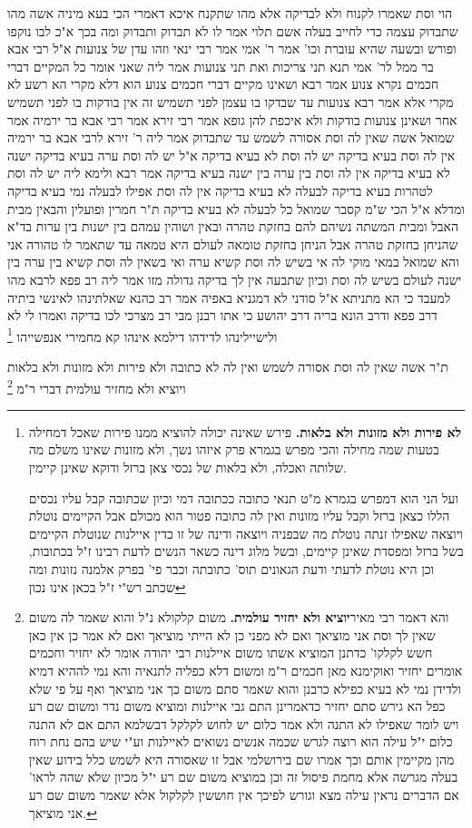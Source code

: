 \documentclass[12pt, openany]{book}
\newcommand{\footnotecomment}[1]{\footnote{#1}}
\newcommand{\commenta}[1]{\footnotecomment{#1}}
\begin{document}
{הוי  וסת שאמרו לקנוח ולא לבדיקה  אלא  מהו שתקנח 
איכא דאמרי הכי בעא מיניה  אשה מהו שתבדוק עצמה כדי לחייב בעלה אשם תלוי  אמר לו  לא תבדוק  ותבדוק ומה בכך  א"כ לבו נוקפו ופורש
ובשעה שהיא עוברת וכו' אמר ר' אמי אמר רבי ינאי  וזהו עדן של צנועות  א"ל רבי אבא בר ממל לר' אמי  תנא תני צריכות ואת תני צנועות  אמר ליה  שאני אומר כל המקיים דברי חכמים נקרא צנוע 
אמר רבא  ושאינו מקיים דברי חכמים צנוע הוא דלא מקרי הא רשע לא מקרי  אלא אמר רבא צנועות עד שבדקו בו עצמן לפני תשמיש זה אין בודקות בו לפני תשמיש אחר  ושאינן צנועות בודקות ולא איכפת להן 
גופא אמר רבי זירא אמר רבי אבא בר ירמיה אמר שמואל  אשה שאין לה וסת אסורה לשמש עד שתבדוק  אמר ליה ר' זירא לרבי אבא בר ירמיה  אין לה וסת בעיא בדיקה יש לה וסת לא בעיא בדיקה 
א"ל  יש לה וסת ערה בעיא בדיקה ישנה לא בעיא בדיקה אין לה וסת בין ערה בין ישנה בעיא בדיקה 
אמר רבא ולימא ליה  יש לה וסת לטהרות בעיא בדיקה לבעלה לא בעיא בדיקה אין לה וסת אפילו לבעלה נמי בעיא בדיקה  ומדלא א"ל הכי ש"מ קסבר שמואל  כל לבעלה לא בעיא בדיקה 
ת"ר  חמרין ופועלין והבאין מבית האבל ומבית המשתה נשיהם להם בחזקת טהרה ובאין ושוהין עמהם בין ישנות בין ערות  בד"א שהניחן בחזקת טהרה אבל הניחן בחזקת טומאה לעולם היא טמאה עד שתאמר לו טהורה אני 
והא שמואל במאי מוקי לה  אי בשיש לה וסת קשיא ערה  ואי בשאין לה וסת קשיא בין ערה בין ישנה 
לעולם בשיש לה וסת וכיון שתבעה אין לך בדיקה גדולה מזו  אמר ליה רב פפא לרבא  מהו למעבד כי הא מתניתא
א"ל  סודני לא דמגניא באפיה  אמר רב כהנא  שאלתינהו לאינשי ביתיה דרב פפא ודרב הונא בריה דרב יהושע כי אתו רבנן מבי רב מצרכי לכו בדיקה  ואמרו לי  לא  ולישיילינהו לדידהו  דילמא אינהו קא מחמירי אנפשייהו 
\commenta{\textbf{לא פירות ולא מזונות ולא בלאות.}  פירש שאינה יכולה להוציא ממנו פירות שאכל דמחילה בטעות שמה מחילה והכי מפרש בגמרא פרק איזהו נשך, ולא מזונות שאינו משלם מה שלותה ואכלה, ולא בלאות של נכסי צאן ברזל ודוקא שאינן קיימין.\par  ועל הני הוא דמפרש בגמרא מ"ט תנאי כתובה ככתובה דמי וכיון שכתובה קבל עליו נכסים הללו כצאן ברזל וקבל עליו מזונות ואין לה כתובה פטור הוא מכולם אבל הקיימים נוטלת ויוצאה שאפילו זנתה נוטלת מה שבפניה ויוצאה ודינה של זו כדין איילנות שנוטלת הקיימים בשל ברזל ומפסדת שאינן קיימים, ובשל מלוג דינה כשאר הנשים לדעת רבינו ז"ל בכתובות, וכן היא נוטלת לדעתי ודעת הגאונים תוס' כתובתה וכבר פי' בפרק אלמנה נזונות ומה שכתב רש"י ז"ל בכאן אינו נכון }

ת"ר  אשה שאין לה וסת אסורה לשמש ואין לה לא כתובה ולא פירות ולא מזונות ולא בלאות ויוציא ולא מחזיר עולמית דברי ר"מ 
\commenta{ והא דאמר רבי מאיר\textbf{יוציא ולא יחזיר עולמית.}  משום קלקולא נ"ל והוא שאמר לה משום שאין לך וסת אני מוציאך ואם לא מפני כן לא הייתי מוציאך ואם לא אמר כן אין כאן חשש לקלקו' כדתנן המוציא אשתו משום איילנות רבי יהודה אומר לא יחזיר וחכמים אומרים יחזיר ואוקימנא מאן חכמים ר"מ ומשום דלא כפליה לתנאיה והא נמי לההיא דמיא ולדידן נמי לא בעיא כפילא כרבנן והוא שאמר סתם משום כך אני מוציאך ואף על פי שלא כפל הא גירש סתם יחזיר כדאמרינן התם גבי איילנות ומוציא משום נדר ומשום שם רע ויש לומר שאפילו לא התנה ולא אמר כלום יש לחוש לקלקל דבשלמא התם אם לא התנה כלום י"ל עילה הוא רוצה לגרש שכמה אנשים נשואים לאיילנות וע"י שיש בהם נחת רוח מהן מקיימין אותם וכך אמרו שם בירושלמי אבל זו שאסורה היא לשמש כלל בידוע שאין בעלה מגרשה אלא מחמת פיסול זה וכן במוציא משום שם רע י"ל מכיון שלא שהה לראו' אם הדברים נראין עילה מצא וגורש לפיכך אין חוששין לקלקול אלא שאמר משום שם רע אני מוציאך. }

}
\end{document}
